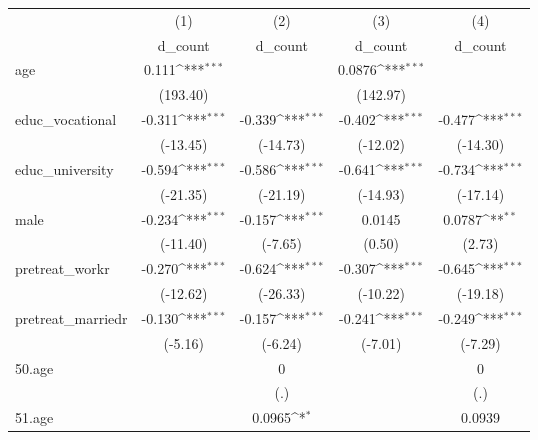{
\def\sym#1{\ifmmode^{#1}\else\(^{#1}\)\fi}
\begin{tabular}{l*{4}{c}}
\hline\hline
            &\multicolumn{1}{c}{(1)}&\multicolumn{1}{c}{(2)}&\multicolumn{1}{c}{(3)}&\multicolumn{1}{c}{(4)}\\
            &\multicolumn{1}{c}{d\_count}&\multicolumn{1}{c}{d\_count}&\multicolumn{1}{c}{d\_count}&\multicolumn{1}{c}{d\_count}\\
\hline
age         &       0.111\sym{***}&                     &      0.0876\sym{***}&                     \\
            &    (193.40)         &                     &    (142.97)         &                     \\
[1em]
educ\_vocational&      -0.311\sym{***}&      -0.339\sym{***}&      -0.402\sym{***}&      -0.477\sym{***}\\
            &    (-13.45)         &    (-14.73)         &    (-12.02)         &    (-14.30)         \\
[1em]
educ\_university&      -0.594\sym{***}&      -0.586\sym{***}&      -0.641\sym{***}&      -0.734\sym{***}\\
            &    (-21.35)         &    (-21.19)         &    (-14.93)         &    (-17.14)         \\
[1em]
male        &      -0.234\sym{***}&      -0.157\sym{***}&      0.0145         &      0.0787\sym{**} \\
            &    (-11.40)         &     (-7.65)         &      (0.50)         &      (2.73)         \\
[1em]
pretreat\_workr&      -0.270\sym{***}&      -0.624\sym{***}&      -0.307\sym{***}&      -0.645\sym{***}\\
            &    (-12.62)         &    (-26.33)         &    (-10.22)         &    (-19.18)         \\
[1em]
pretreat\_marriedr&      -0.130\sym{***}&      -0.157\sym{***}&      -0.241\sym{***}&      -0.249\sym{***}\\
            &     (-5.16)         &     (-6.24)         &     (-7.01)         &     (-7.29)         \\
[1em]
50.age      &                     &           0         &                     &           0         \\
            &                     &         (.)         &                     &         (.)         \\
[1em]
51.age      &                     &      0.0965\sym{*}  &                     &      0.0939         \\

\end{tabular}}
